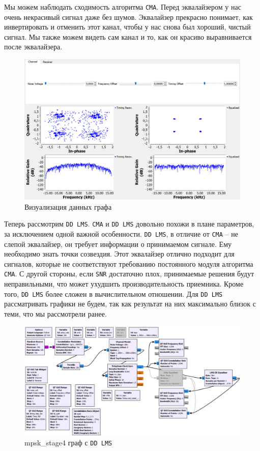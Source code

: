 \documentclass[a4paper,12pt]{report}
\begin{document}
Мы можем наблюдать сходимость алгоритма \texttt{CMA}. Перед эквалайзером у нас очень некрасивый сигнал даже без шумов. Эквалайзер прекрасно понимает, как инвертировать и отменить этот канал, чтобы у нас снова был хороший, чистый сигнал. Мы также можем видеть сам канал и то, как он красиво выравнивается после эквалайзера.

\begin{figure}[H]
        \centering
        \includegraphics[width=1.0\textwidth]{23.png}
        \caption{Визуализация данных графа}
        \label{fig:lab12_fig5_2}
\end{figure}

Теперь рассмотрим \texttt{DD LMS}. \texttt{CMA} и \texttt{DD LMS} довольно похожи в плане параметров, за исключением одной важной особенности. \texttt{DD LMS}, в отличие от \texttt{CMA} – не слепой эквалайзер, он требует информации о принимаемом сигнале. Ему необходимо знать точки созвездия. Этот эквалайзер отлично подходит для сигналов, которые не соответствуют требованию постоянного модуля алгоритма \texttt{CMA}. С другой стороны, если \texttt{SNR} достаточно плох, принимаемые решения будут неправильными, что может ухудшить производительность приемника. Кроме того, \texttt{DD LMS} более сложен в вычислительном отношении. Для \texttt{DD LMS} рассматривать графики не будем, так как результат на них максимально близок с теми, что мы рассмотрели ранее.

\begin{figure}[H]
        \centering
        \includegraphics[width=1.0\textwidth]{24.png}
        \caption{mpsk\_stage4 граф с \texttt{DD LMS}}
        \label{fig:lab12_fig5_3}
\end{figure}
\end{document}
